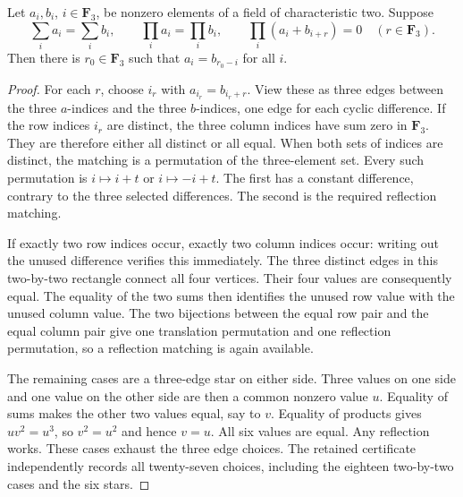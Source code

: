 \begin{lemma}
\label{lem:DE-Moore-six-matching}
Let \(a_i,b_i\), \(i\in\mathbf F_3\), be nonzero elements of a
field of characteristic two.  Suppose
\[
 \sum_i a_i=\sum_i b_i,\qquad
 \prod_i a_i=\prod_i b_i,\qquad
 \prod_i(a_i+b_{i+r})=0\quad(r\in\mathbf F_3).
                                                               \tag{DE-MC10}
\]
Then there is \(r_0\in\mathbf F_3\) such that
\(a_i=b_{r_0-i}\) for all \(i\).
\end{lemma}
\begin{proof}
For each \(r\), choose \(i_r\) with \(a_{i_r}=b_{i_r+r}\).
View these as three edges between the three \(a\)-indices and
the three \(b\)-indices, one edge for each cyclic difference.
If the row indices \(i_r\) are distinct, the three column
indices have sum zero in \(\mathbf F_3\).  They are therefore
either all distinct or all equal.  When both sets of indices
are distinct, the matching is a permutation of the three-element
set.  Every such permutation is \(i\mapsto i+t\) or
\(i\mapsto-i+t\).  The first has a constant difference,
contrary to the three selected differences.  The second is
the required reflection matching.

If exactly two row indices occur, exactly two column indices
occur: writing out the unused difference verifies this immediately.
The three distinct edges in this two-by-two rectangle connect
all four vertices.  Their four values are consequently equal.
The equality of the two sums then identifies the unused row value
with the unused column value.  The two bijections between the
equal row pair and the equal column pair give one translation
permutation and one reflection permutation, so a reflection
matching is again available.

The remaining cases are a three-edge star on either side.
Three values on one side and one value on the other side are
then a common nonzero value \(u\).  Equality of sums makes
the other two values equal, say to \(v\).  Equality of products
gives \(uv^2=u^3\), so \(v^2=u^2\) and hence \(v=u\).
All six values are equal.  Any reflection works.
These cases exhaust the three edge choices.  The retained
certificate independently records all twenty-seven choices,
including the eighteen two-by-two cases and the six stars.
\end{proof}

